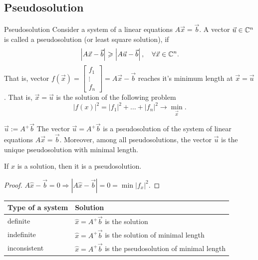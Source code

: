 \subsection*{Pseudosolution}
    \begin{definition}{Pseudosolution}{}
        Consider a system of a linear equations $A\vec{x} = \vec{b}$. A vector $\vec{u} \in \mathbb{C}^n$ is called a pseudosolution (or least square solution), if
        \[
            \left| A\vec{x} - \vec{b} \right| \geqslant \left| A\vec{u} - \vec{b} \right|,
            \quad
            \forall \vec{x} \in \mathbb{C}^n. 
        \]
        That is, vector $f(\vec{x}) =\begin{bmatrix}f_1\\ \vdots\\f_n\end{bmatrix}= A\vec{x}-\vec{b}$ reaches it's minimum length at $\vec{x}=\vec{u}$. That is, $\vec{x}=\vec{u}$ is the solution of the following problem
        $$|f(x)|^2 = |f_1|^2 + \ldots + |f_n|^2 \rightarrow \mathop{min}_{\vec{x}}.$$ 
    \end{definition}
    \begin{theorema}{$\vec{u} := A^+\vec{b}$}{}
        The vector $\vec{u} = A^+\vec{b}$ is a pseudosolution of the system of linear equations $A\vec{x} = \vec{b}$. Moreover, among all pseudosolutions, the vector $\vec{u}$ is the unique pseudosolution with minimal length.
    \end{theorema}
    \begin{proposition}{}{}
        If $\hat{x}$ is a solution, then it is a pseudosolution.
    \end{proposition}
    \begin{proof}
        $A\hat{x} - \vec{b} = 0 \Longrightarrow \left| A\hat{x} - \vec{b} \right| = 0 = \min |f_x|^2.$
    \end{proof}
    \vspace*{0.2cm}
    \begin{proposition}{1}{}
        \begin{tabular}{|l|l|}
            \hline
            Type of a system & Solution \\ \hline
            definite         &      $\hat{x}=A^+\vec{b}$  is the solution  \\ \hline
            indefinite       &   $\hat{x}=A^+\vec{b}$  is the solution of minimal length       \\ \hline
            inconsistent     &    $\hat{x}=A^+\vec{b}$  is the pseudosolution  of minimal length    \\ \hline
        \end{tabular}
    \end{proposition}
